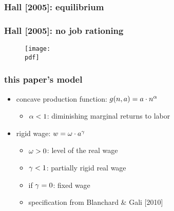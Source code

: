 \documentclass[12pt,xcolor={dvipsnames},hyperref={pdftex,pdfpagemode=UseNone,hidelinks,pdfdisplaydoctitle=true},usepdftitle=false]{beamer}
\def\pdf{xrationing.pdf}
\begin{document}
\begin{frame}
 \frametitle{Hall [2005]: equilibrium}
\end{frame}

\begin{frame}
\frametitle{Hall [2005]: no job rationing}
\begin{figure}
\texttt{[image: \\pdf]}%
\end{figure}
\end{frame}

\begin{frame}
 \frametitle{this paper's model}
\begin{itemize}
\item concave production function: $g(n,a)=a\cdot n^{\alpha}$
\begin{itemize}
\item $\alpha<1$: diminishing marginal returns to labor
\end{itemize}
\item rigid wage: $w= \omega\cdot a^{\gamma}$
\begin{itemize}
\item $\omega>0$: level of the real wage
\item $\gamma<1$: partially rigid real wage
\item if $\gamma=0$: fixed wage
\item specification from Blanchard \& Gali [2010]
\end{itemize}
\end{itemize}
\end{frame}
\end{document}
